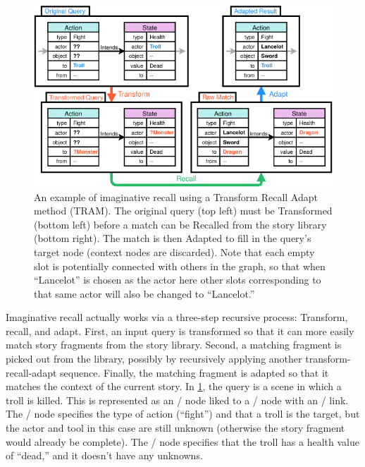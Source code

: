 \begin{figure}[!t]
\centering
\includegraphics[width=\textwidth]{fig/cropped-im-example.pdf}
\caption[Imaginative recall example]{An example of imaginative recall using a Transform Recall Adapt method (TRAM). The original query (top left) must be Transformed (bottom left) before a match can be Recalled from the story library (bottom right). The match is then Adapted to fill in the query's target node (context nodes are discarded). Note that each empty slot is potentially connected with others in the graph, so that when ``Lancelot'' is chosen as the actor here other slots corresponding to that same actor will also be changed to ``Lancelot.''}
\label{fig:im-example}
\end{figure}


Imaginative recall actually works via a three-step recursive process: Transform, recall, and adapt.
%
First, an input query is transformed so that it can more easily match story fragments from the story library.
%
Second, a matching fragment is picked out from the library, possibly by recursively applying another transform-recall-adapt sequence.
%
Finally, the matching fragment is adapted so that it matches the context of the current story.
%
In \cref{fig:im-example}, the query is a scene in which a troll is killed.
%
This is represented as an \gna/ node liked to a \gns/ node with an \gei/ link.
%
The \gna/ node specifies the type of action (``fight'') and that a troll is the target, but the actor and tool in this case are still unknown (otherwise the story fragment would already be complete).
%
The \gns/ node specifies that the troll has a health value of ``dead,'' and it doesn't have any unknowns.


